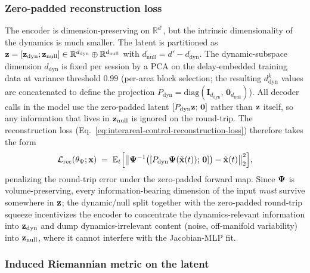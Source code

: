 \subsubsection{Zero-padded reconstruction loss}\label{supp:interareal-control-zero-pad-rec}

The encoder is dimension-preserving on $\mathbb{R}^{d'}$, but the intrinsic dimensionality of the dynamics is much smaller. The latent is partitioned as $\vb{z}=[\vb{z}_{\mathrm{dyn}};\vb{z}_{\mathrm{null}}]\in\mathbb{R}^{d_{\mathrm{dyn}}}\oplus\mathbb{R}^{d_{\mathrm{null}}}$ with $d_{\mathrm{null}}=d'-d_{\mathrm{dyn}}$. The dynamic-subspace dimension $d_{\mathrm{dyn}}$ is fixed per session by a PCA on the delay-embedded training data at variance threshold $0.99$ (per-area block selection; the resulting $d_{\mathrm{dyn}}^{k}$ values are concatenated to define the projection $P_{\mathrm{dyn}}=\mathrm{diag}(\mathbf{I}_{d_{\mathrm{dyn}}},\,\mathbf{0}_{d_{\mathrm{null}}})$). All decoder calls in the model use the zero-padded latent $[P_{\mathrm{dyn}}\vb{z};\,\vb{0}]$ rather than $\vb{z}$ itself, so any information that lives in $\vb{z}_{\mathrm{null}}$ is ignored on the round-trip. The reconstruction loss (Eq.~\ref{eq:interareal-control-reconstruction-loss}) therefore takes the form
\begin{equation}
\mathcal{L}_{\mathrm{rec}}(\theta_{\Psi};\vb{x}) \;=\; \mathbb{E}_{t}\Bigl[\bigl\|\vb{\Psi}^{-1}\bigl([P_{\mathrm{dyn}}\vb{\Psi}(\tilde{\vb{x}}(t));\,\vb{0}]\bigr)-\tilde{\vb{x}}(t)\bigr\|_{2}^{2}\Bigr],
\end{equation}
penalizing the round-trip error under the zero-padded forward map. Since $\vb{\Psi}$ is volume-preserving, every information-bearing dimension of the input \emph{must} survive somewhere in $\vb{z}$; the dynamic/null split together with the zero-padded round-trip squeeze incentivizes the encoder to concentrate the dynamics-relevant information into $\vb{z}_{\mathrm{dyn}}$ and dump dynamics-irrelevant content (noise, off-manifold variability) into $\vb{z}_{\mathrm{null}}$, where it cannot interfere with the Jacobian-MLP fit.

\subsubsection{Induced Riemannian metric on the latent}\label{supp:interareal-control-induced-metric}


